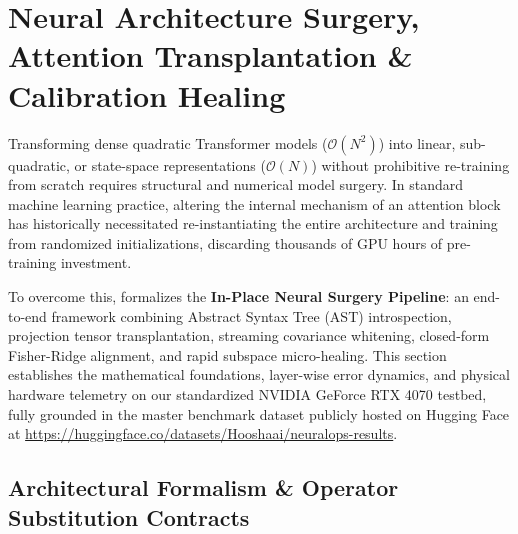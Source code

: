 
\section{Neural Architecture Surgery, Attention Transplantation \& Calibration Healing}
\label{sec:model_surgery}

Transforming dense quadratic Transformer models ($\mathcal{O}(N^2)$) into linear, sub-quadratic, or state-space representations ($\mathcal{O}(N)$) without prohibitive re-training from scratch requires structural and numerical model surgery. In standard machine learning practice, altering the internal mechanism of an attention block has historically necessitated re-instantiating the entire architecture and training from randomized initializations, discarding thousands of GPU hours of pre-training investment.

To overcome this, \neuralops{} formalizes the \textbf{In-Place Neural Surgery Pipeline}: an end-to-end framework combining Abstract Syntax Tree (AST) introspection, projection tensor transplantation, streaming covariance whitening, closed-form Fisher-Ridge alignment, and rapid subspace micro-healing. This section establishes the mathematical foundations, layer-wise error dynamics, and physical hardware telemetry on our standardized NVIDIA GeForce RTX 4070 testbed, fully grounded in the master benchmark dataset publicly hosted on Hugging Face at \url{https://huggingface.co/datasets/Hooshaai/neuralops-results}.

\subsection{Architectural Formalism \& Operator Substitution Contracts}
\label{sec:surgery_formalism}


